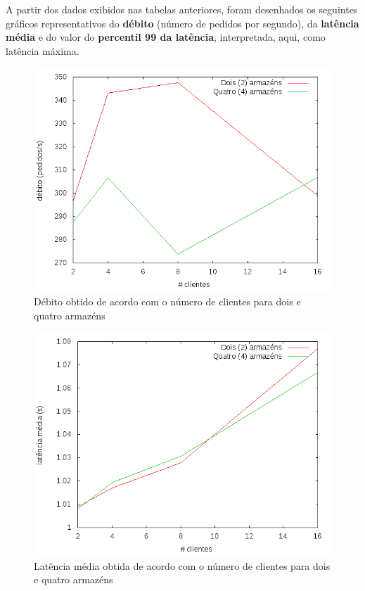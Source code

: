 A partir dos dados exibidos nas tabelas anteriores, foram desenhados os seguintes gráficos representativos do \textbf{débito} (número de pedidos por segundo), da \textbf{latência média} e do valor do \textbf{percentil 99 da latência}, interpretada, aqui, como latência máxima.

\begin{figure}[!h]
\centering
\includegraphics[scale=.4]{img/questao-1/read-uncom-deb}
\caption{Débito obtido de acordo com o número de clientes para dois e quatro armazéns}
\end{figure}

\newpage

\begin{figure}[!h]
\centering
\includegraphics[scale=.4]{img/questao-1/read-uncom-lat-med}
\caption{Latência média obtida de acordo com o número de clientes para dois e quatro armazéns}
\end{figure}

